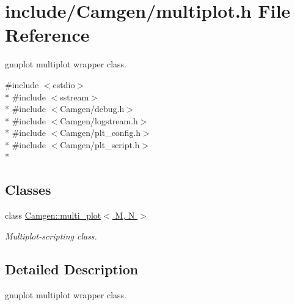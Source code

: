 \hypertarget{a00699}{}\section{include/\+Camgen/multiplot.h File Reference}
\label{a00699}


gnuplot multiplot wrapper class.  


{\ttfamily \#include $<$cstdio$>$}\\*
{\ttfamily \#include $<$sstream$>$}\\*
{\ttfamily \#include $<$Camgen/debug.\+h$>$}\\*
{\ttfamily \#include $<$Camgen/logstream.\+h$>$}\\*
{\ttfamily \#include $<$Camgen/plt\+\_\+config.\+h$>$}\\*
{\ttfamily \#include $<$Camgen/plt\+\_\+script.\+h$>$}\\*
\subsection*{Classes}
\begin{DoxyCompactItemize}
\item 
class \hyperlink{a00380}{Camgen\+::multi\+\_\+plot$<$ M, N $>$}
\begin{DoxyCompactList}\small\item\em Multiplot-\/scripting class. \end{DoxyCompactList}\end{DoxyCompactItemize}


\subsection{Detailed Description}
gnuplot multiplot wrapper class. 

